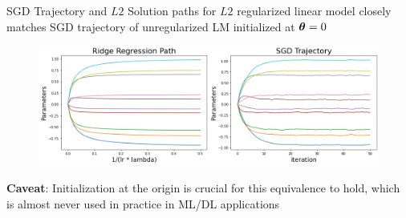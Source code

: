 \documentclass[11pt,compress,t,notes=noshow, xcolor=table]{beamer}
\begin{document}
\begin{vbframe}{SGD Trajectory and $L2$ }
Solution paths for $L2$ regularized linear model closely matches SGD trajectory of unregularized LM initialized at $\bm{\theta}=0$
\lz
  \begin{figure}
    \centering
      {\includegraphics{figure_man/ridge-vs-sgd-path.png}}
  \end{figure}

\textbf{Caveat}: Initialization at the origin is crucial for this equivalence to hold, which is almost never used in practice in ML/DL applications

\end{vbframe}

\endlecture
\end{document}
